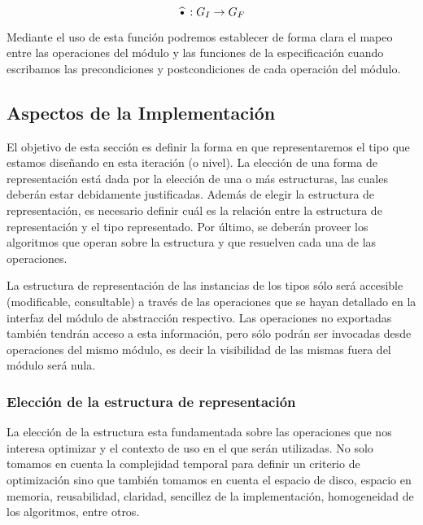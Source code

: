 \begin{equation*}
 \widehat{\text{\textbullet}}: G_I \rightarrow G_F
\end{equation*}

Mediante el uso de esta funci\'on podremos establecer de forma clara el mapeo entre las operaciones del m\'odulo y las funciones de la especificaci\'on cuando escribamos las precondiciones y postcondiciones de cada operaci\'on del m\'odulo.

\subsection{Aspectos de la Implementaci\'on}

El objetivo de esta secci\'on es definir la forma en que representaremos el tipo que estamos dise\~nando en esta iteraci\'on (o nivel). La elecci\'on de una forma de representaci\'on est\'a dada por la elecci\'on de una o m\'as estructuras, las cuales deber\'an estar debidamente justificadas. Adem\'as de elegir la estructura de representaci\'on, es necesario definir cu\'al es la relaci\'on entre la estructura de representaci\'on y el tipo representado. Por \'ultimo, se deber\'an proveer los algoritmos que operan sobre la estructura y que resuelven cada una de las operaciones.

La estructura de representaci\'on de las instancias de los tipos s\'olo ser\'a accesible (modificable, consultable) a trav\'es de las operaciones que se hayan detallado en la interfaz del m\'odulo de abstracci\'on respectivo. Las operaciones no exportadas tambi\'en tendr\'an acceso a esta informaci\'on, pero s\'olo podr\'an ser invocadas desde operaciones del mismo m\'odulo, es decir la visibilidad de las mismas fuera del m\'odulo ser\'a nula.

\subsubsection{Elecci\'on de la estructura de representaci\'on} %

La elecci\'on de la estructura esta fundamentada sobre las operaciones que nos interesa optimizar y el contexto de uso en el que ser\'an utilizadas. No solo tomamos en cuenta la complejidad temporal para definir un criterio de optimizaci\'on sino que tambi\'en tomamos en cuenta el espacio de disco, espacio en memoria, reusabilidad, claridad, sencillez de la implementaci\'on, homogeneidad de los algoritmos, entre otros.

